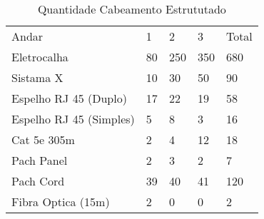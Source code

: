 \begin{table}[H]
\centering
\caption{Quantidade Cabeamento Estrututado}
\label{my-label}
\begin{tabular}{lllll}
Andar                   & 1  & 2   & 3   & Total \\
Eletrocalha             & 80 & 250 & 350 & 680   \\
Sistama X               & 10 & 30  & 50  & 90    \\
Espelho RJ 45 (Duplo)   & 17 & 22  & 19  & 58    \\
Espelho RJ 45 (Simples) & 5  & 8   & 3   & 16    \\
Cat 5e 305m             & 2  & 4   & 12  & 18    \\
Pach Panel              & 2  & 3   & 2   & 7     \\
Pach Cord               & 39 & 40  & 41  & 120   \\
Fibra Optica (15m)      & 2  & 0   & 0   & 2    
\end{tabular}
\end{table}